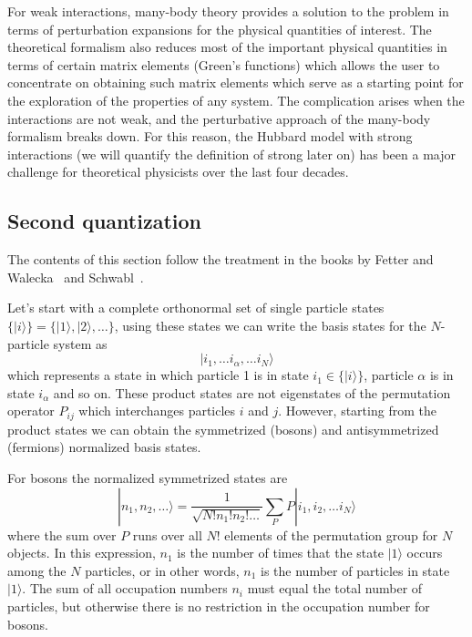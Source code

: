 \documentclass[oneside,11pt]{memoir}
\begin{document}
For weak interactions, many-body theory provides a solution to the problem in
terms of perturbation expansions for the physical quantities of interest.   The
theoretical formalism also reduces most of the important physical quantities in
terms of certain matrix elements (Green's functions) which allows the user to
concentrate on obtaining such matrix elements which serve as a starting point
for the exploration of the properties of any system.   The complication arises
when the interactions are not weak, and the perturbative approach of the
many-body formalism breaks down.   For this reason, the Hubbard model with strong
interactions (we will quantify the definition of strong later on) has been a
major challenge for theoretical physicists over the last four decades. 
 


\subsection{Second quantization}

The contents of this section follow the treatment in the books by Fetter and
Walecka~\cite{fetter2003quantum} and Schwabl~\cite{schwabl2005advanced}.  

Let's start with a complete orthonormal set of single particle states $\lbrace
|i\rangle \rbrace = \lbrace |1\rangle, |2\rangle, \ldots \rbrace$, using these
states we can write the basis states for the $N$-particle system as
\begin{equation}
   | i_{1}, \ldots i_{\alpha}, \ldots i_{N} \rangle  
\end{equation} 
which represents a state in which particle 1 is in state $i_{1} \in \lbrace
|i\rangle \rbrace$, particle $\alpha$ is in state $i_{\alpha}$ and so on.
These product states are not eigenstates of the permutation operator $P_{ij}$
which interchanges particles $i$ and $j$.  However, starting from the product
states we can obtain the symmetrized (bosons) and antisymmetrized (fermions)
normalized basis states.   

For bosons the normalized symmetrized states are
\begin{equation} 
  | n_{1},  n_{2}, \ldots \rangle = 
  \frac{1}{\sqrt{N!n_{1}!n_{2}!\ldots}} \sum_{P}  P | i_{1},  i_{2}, \ldots i_{N} \rangle
\end{equation} 
where the sum over $P$ runs over all $N!$ elements of the permutation group for
$N$ objects.  In this expression, $n_{1}$ is the number of times that the state
$|1\rangle$ occurs among the $N$ particles,  or in other words, $n_{1}$ is the
number of particles in state $|1\rangle$.  The sum of all occupation numbers
$n_{i}$ must equal the total number of particles, but otherwise there is no
restriction in the occupation number for bosons.
\end{document}
